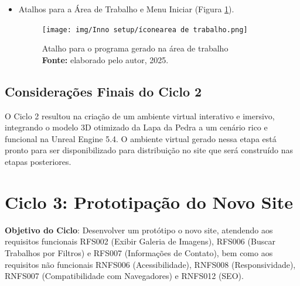 \begin{itemize}
    \item Atalhos para a Área de Trabalho e Menu Iniciar (Figura \ref{fig:atalho_icone}). 
    \begin{figure}[H]
        \centering
        \texttt{[image: img/Inno setup/íconearea de trabalho.png]}
        \caption{Atalho para o programa gerado na área de trabalho \\
            \textbf{Fonte:} elaborado pelo autor, 2025.}
        \label{fig:atalho_icone}
\end{figure}
    
\end{itemize}




\subsection*{Considerações Finais do Ciclo 2}
O Ciclo 2 resultou na criação de um ambiente virtual interativo e imersivo, integrando o modelo 3D otimizado da Lapa da Pedra a um cenário rico e funcional na Unreal Engine 5.4. O ambiente virtual gerado nessa etapa está pronto para ser disponibilizado para distribuição no site que será construído nas etapas posteriores.






\section{Ciclo 3: Prototipação do Novo Site}
\label{sec:ciclo3_site}

\textbf{Objetivo do Ciclo}: Desenvolver um protótipo o novo site, atendendo aos requisitos funcionais RFS002 (Exibir Galeria de Imagens), RFS006 (Buscar Trabalhos por Filtros) e RFS007 (Informações de Contato), bem como aos requisitos não funcionais RNFS006 (Acessibilidade), RNFS008 (Responsividade), RNFS007 (Compatibilidade com Navegadores) e RNFS012 (SEO).

